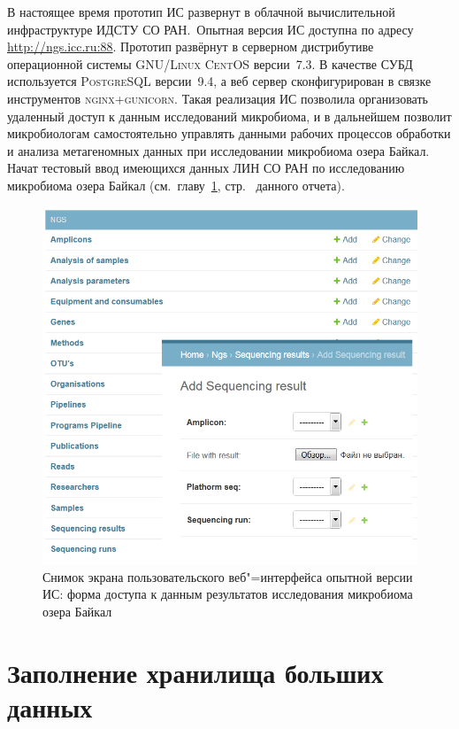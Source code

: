 \documentclass[a4paper,12pt,openany,final]{extreport}
\def\oldcaption{} \let\oldcaption=\caption
\def\caption{\stepcounter{captionsnum}\oldcaption}
\begin{document}
В настоящее время прототип ИС развернут в облачной вычислительной инфраструктуре ИДСТУ СО РАН.~Опытная версия ИС доступна по адресу \href{http://ngs.icc.ru:88}{{http://ngs.icc.ru:88}}. Прототип развёрнут в серверном дистрибутиве операционной системы \textsc{GNU/Linux CentOS} версии~7.3. В качестве СУБД используется \textsc{PostgreSQL} версии~9.4, а веб сервер сконфигурирован в связке инструментов \textsc{nginx+gunicorn}. Такая реализация ИС позволила организовать удаленный доступ к данным исследований микробиома, и в дальнейшем позволит микробиологам самостоятельно управлять данными рабочих процессов обработки и анализа метагеномных данных при исследовании микробиома озера Байкал. Начат тестовый ввод имеющихся данных ЛИН СО РАН по исследованию микробиома озера Байкал (см.~главу~\ref{chap:8}, стр.~\pageref{chap:8} данного отчета).

\begin{figure}\centering
\includegraphics[width=0.9\linewidth]{media/image17.png}

\caption{Снимок экрана пользовательского веб"=интерфейса опытной версии ИС: форма доступа к данным результатов исследования микробиома озера Байкал}
\end{figure}

\chapter{Заполнение хранилища больших данных}\label{chap:8}
\end{document}
